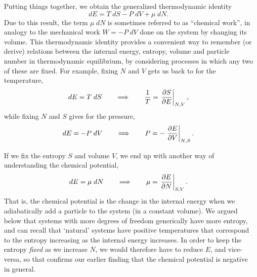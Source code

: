 Putting things together, we obtain the generalized thermodynamic identity
\begin{equation}
  dE = T \; dS - P \; dV + \mu \; dN.
\end{equation}
Due to this result, the term $\mu \; dN$ is sometimes referred to as ``chemical work'', in analogy to the mechanical work $W = - P \; dV$ done on the system by changing its volume.
This thermodynamic identity provides a convenient way to remember (or derive) relations between the internal energy, entropy, volume and particle number in thermodynamic equilibrium, by considering processes in which any two of these are fixed.
For example, fixing $N$ and $V$ gets us back to  for the temperature,
\begin{equation*}
  dE = T \; dS \qquad \Longrightarrow \qquad \frac{1}{T} = \left.\frac{\partial S}{\partial E}\right|_{N, V},
\end{equation*}
while fixing $N$ and $S$ gives  for the pressure,
\begin{equation*}
  dE = -P \; dV \qquad \Longrightarrow \qquad P = -\left.\frac{\partial E}{\partial V}\right|_{N, S}.
\end{equation*}

If we fix the entropy $S$ and volume $V$, we end up with another way of understanding the chemical potential,
\begin{equation}
  \label{eq:mu_E}
  dE = \mu \; dN \qquad \Longrightarrow \qquad \mu = \left.\frac{\partial E}{\partial N}\right|_{S, V}.
\end{equation}
That is, the chemical potential is the change in the internal energy when we adiabatically add a particle to the system (in a constant volume).
We argued below  that systems with more degrees of freedom generically have more entropy, and can recall that `natural' systems have positive temperatures that correspond to the entropy increasing as the internal energy increases.
In order to keep the entropy \textit{fixed} as we increase $N$, we would therefore have to reduce $E$, and vice-versa, so that  confirms our earlier finding that the chemical potential is negative in general.
